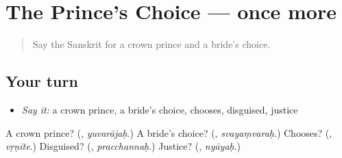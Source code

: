 \section[(dialogue)]{The Prince's Choice — once more}

\label{lesson:SA-R339-review-final-339}



\begin{quote}
Say the Sanskrit for a crown prince and a bride's choice.
\end{quote}

\subsection*{Your turn}
\begin{itemize}
\raggedright
  \item \emph{Say it:} a crown prince, a bride's choice, chooses, disguised, justice
\end{itemize}

\begin{tcolorbox}[breakable,colback=teal!4,colframe=teal!35!black,title={Before you move on}]
A crown prince? (\textbf{}, \emph{yuvarājaḥ}.) A bride's choice? (\textbf{}, \emph{svayaṃvaraḥ}.) Chooses? (\textbf{}, \emph{vṛṇīte}.) Disguised? (\textbf{}, \emph{pracchannaḥ}.) Justice? (\textbf{}, \emph{nyāyaḥ}.)
\end{tcolorbox}
